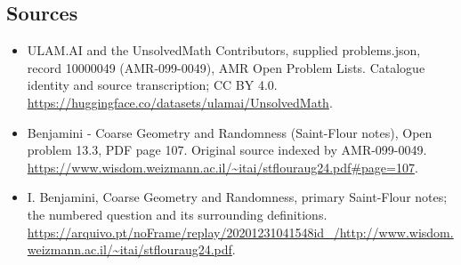 \documentclass[11pt,a4paper]{article}
\begin{document}
\subsection{Sources}
\begin{itemize}
\item[S1] ULAM.AI and the UnsolvedMath Contributors, supplied problems.json, record 10000049 (AMR-099-0049), AMR Open Problem Lists. Catalogue identity and source transcription; CC BY 4.0.
\url{https://huggingface.co/datasets/ulamai/UnsolvedMath}.
\item[S2] Benjamini - Coarse Geometry and Randomness (Saint-Flour notes), Open problem 13.3, PDF page 107. Original source indexed by AMR-099-0049.
\url{https://www.wisdom.weizmann.ac.il/~itai/stflouraug24.pdf#page=107}.
\item[S3] I. Benjamini, Coarse Geometry and Randomness, primary Saint-Flour notes; the numbered question and its surrounding definitions.
\url{https://arquivo.pt/noFrame/replay/20201231041548id_/http://www.wisdom.weizmann.ac.il/~itai/stflouraug24.pdf}.
\end{itemize}
\end{document}
